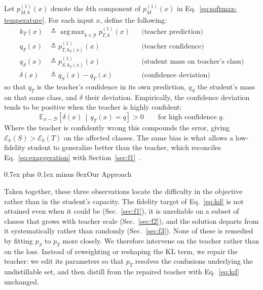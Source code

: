 \documentclass[10pt,journal,compsoc]{IEEEtran}
\makeatletter
\def\subsection{\@startsection{subsection}{2}{\z@}{-3.5ex plus -0.5ex minus -1.5ex}%
{0.7ex plus 0.1ex minus 0ex}{\normalfont\normalsize\sffamily\bfseries}}
\theoremstyle{definition}
\DeclareMathOperator*{\argmax}{arg\,max}
\makeatother
\begin{document}
Let $p_{M,k}^{(1)}(x)$ denote the $k$th component of $p_M^{(1)}(x)$ in
Eq.~\eqref{eq:softmax-temperature}. For each input $x$, define the following:
\begin{align*}
k_T(x) &\triangleq \argmax_{k\in\mathcal{Y}} p_{T,k}^{(1)}(x)
  && \text{(teacher prediction)} \\
q_T(x) &\triangleq p_{T,k_T(x)}^{(1)}(x)
  && \text{(teacher confidence)} \\
q_S(x) &\triangleq p_{S,k_T(x)}^{(1)}(x)
  && \text{(student mass on teacher's class)} \\
\delta(x) &\triangleq q_S(x) - q_T(x)
  && \text{(confidence deviation)}
\end{align*}
so that $q_T$ is the teacher's confidence in its own prediction, $q_S$ the
student's mass on that same class, and $\delta$ their deviation. Empirically,
the confidence deviation tends to be positive when the teacher is highly
confident:
\begin{equation}
\label{eq:exaggeration}
\mathbb{E}_{x\sim\mathcal{D}}\!\left[
\delta(x) \,\middle|\, q_T(x)=q
\right] > 0
\qquad \text{for high confidence } q.
\end{equation}
Where the teacher is confidently wrong this compounds the error, giving
$\mathcal{E}_k(S) > \mathcal{E}_k(T)$ on the affected classes. The same bias is
what allows a low-fidelity student to generalize better than the teacher, which
reconciles Eq.~\eqref{eq:exaggeration} with
Section~\ref{sec:f1}~\cite{nagarajan2023student}.

\vspace{-5pt}
\subsection{Our Approach}
\label{subsec:approach}

Taken together, these three observations locate the difficulty in the
objective rather than in the student's capacity. The fidelity target of
Eq.~\eqref{eq:kd} is not attained even when it could be
(Sec.~\ref{sec:f1}), it is unreliable on a subset of classes that grows
with teacher scale (Sec.~\ref{sec:f2}), and the solution departs from it
systematically rather than randomly (Sec.~\ref{sec:f3}). None of these is
remedied by fitting $p_S$ to $p_T$ more closely. We therefore intervene on the
teacher rather than on the loss. Instead of reweighting or reshaping the KL
term, we repair the teacher: we edit its parameters so that $p_T$ resolves
the confusions underlying the undistillable set, and then distill from the
repaired teacher with Eq.~\eqref{eq:kd} unchanged.
\end{document}
